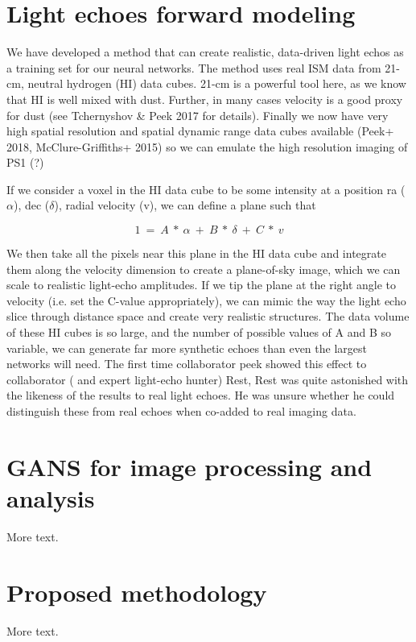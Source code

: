 \documentclass{proposalnsf}
\begin{document}
\section{Light echoes forward modeling}\label{sec:fwm}

We have developed a method that can create realistic, data-driven light echos as a training set for our neural networks. The method uses real ISM data from 21-cm, neutral hydrogen (HI)  data cubes. 21-cm is a powerful tool here, as we know that HI is well mixed with dust. Further, in many cases velocity is a good proxy for dust (see Tchernyshov & Peek 2017 for details). Finally we now have very high spatial resolution and spatial dynamic range data cubes available (Peek+ 2018, McClure-Griffiths+ 2015) so we can emulate the high resolution imaging of PS1 (?)

If we consider a voxel in the HI data cube to be some intensity at a position ra ($\alpha$), dec ($\delta$), radial velocity (v), we can define a plane such that 

$$1~=~A~*~\alpha~+~B~*~\delta~+~C~*~v$$

We then take all the pixels near this plane in the HI data cube and integrate them along the velocity dimension to create a plane-of-sky image, which we can scale to realistic light-echo amplitudes. If we tip the plane at the right angle to velocity (i.e. set the C-value appropriately), we can mimic the way the light echo slice through distance space and create very realistic structures. The data volume of these HI cubes is so large, and the number of possible values of A and B so variable, we can generate far more synthetic echoes than even the largest networks will need. The first time collaborator peek showed this effect to collaborator ( and expert  light-echo hunter) Rest, Rest was quite astonished with the likeness of the results to real light echoes. He was unsure whether he could distinguish these from real echoes when co-added to real imaging data.


\section{GANS for image processing and analysis}

More text.

\section{Proposed methodology}

More text.
\end{document}
